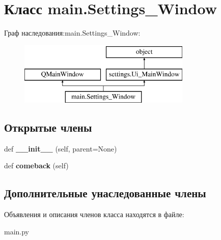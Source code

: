 \hypertarget{classmain_1_1_settings___window}{}\section{Класс main.\+Settings\+\_\+\+Window}
\label{classmain_1_1_settings___window}
Граф наследования\+:main.\+Settings\+\_\+\+Window\+:\begin{figure}[H]
\begin{center}
\leavevmode
\includegraphics[height=3.000000cm]{classmain_1_1_settings___window}
\end{center}
\end{figure}
\subsection*{Открытые члены}
\begin{DoxyCompactItemize}
\item 
\mbox{\label{classmain_1_1_settings___window_a9a71b80b274df84584140745db8d627c}} 
def {\bfseries \+\_\+\+\_\+init\+\_\+\+\_\+} (self, parent=None)
\item 
\mbox{\label{classmain_1_1_settings___window_ab70b9a9449ffc4079e1b0a8516efb65a}} 
def {\bfseries comeback} (self)
\end{DoxyCompactItemize}
\subsection*{Дополнительные унаследованные члены}


Объявления и описания членов класса находятся в файле\+:\begin{DoxyCompactItemize}
\item 
main.\+py\end{DoxyCompactItemize}
